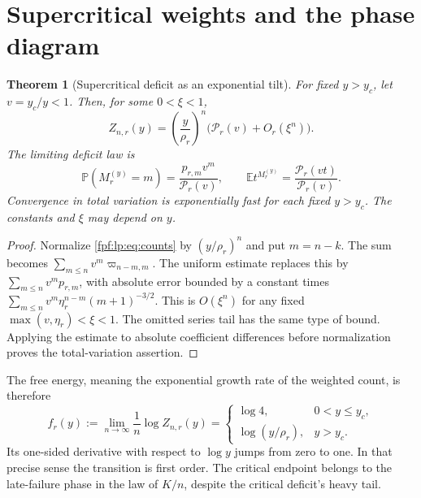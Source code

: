 \documentclass[11pt]{article}
\numberwithin{equation}{section}
\newtheorem{theorem}{Theorem}[section]
\theoremstyle{definition}
\newcommand{\E}{\mathbb E}
\newcommand{\Prob}{\mathbb P}
\begin{document}
\section{Supercritical weights and the phase diagram}
\label{fpf:lp:sec:supercritical}

\begin{theorem}[Supercritical deficit as an exponential tilt]
\label{fpf:lp:thm:supercritical}
For fixed \(y>y_c\), let \(v=y_c/y<1\). Then, for some \(0<\xi<1\),
\begin{equation}\label{fpf:lp:eq:super-Z}
 Z_{n,r}(y)=\left(\frac y{\rho_r}\right)^n
                   \bigl(\mathcal P_r(v)+O_r(\xi^n)\bigr).
\end{equation}
The limiting deficit law is
\begin{equation}\label{fpf:lp:eq:super-law}
 \Prob(M_r^{(y)}=m)=\frac{p_{r,m}v^m}{\mathcal P_r(v)},\qquad
 \E t^{M_r^{(y)}}=\frac{\mathcal P_r(vt)}{\mathcal P_r(v)}.
\end{equation}
Convergence in total variation is exponentially fast for each fixed
\(y>y_c\). The constants and \(\xi\) may depend on \(y\).
\end{theorem}
\begin{proof}
Normalize \eqref{fpf:lp:eq:counts} by \((y/\rho_r)^n\) and put \(m=n-k\).
The sum becomes \(\sum_{m\le n}v^m\varpi_{n-m,m}\). The uniform estimate
replaces this by \(\sum_{m\le n}v^mp_{r,m}\), with absolute error
bounded by a constant times
\(\sum_{m\le n}v^m\eta_r^{n-m}(m+1)^{-3/2}\).
This is \(O(\xi^n)\) for any fixed
\(\max(v,\eta_r)<\xi<1\). The omitted series tail has the same type
of bound. Applying the estimate to absolute coefficient differences
before normalization proves the total-variation assertion.
\end{proof}

The free energy, meaning the exponential growth rate of the weighted
count, is therefore
\begin{equation}\label{fpf:lp:eq:free-energy}
 f_r(y):=\lim_{n\to\infty}\frac1n\log Z_{n,r}(y)
 =\begin{cases}\log4,&0<y\le y_c,\\
                 \log(y/\rho_r),&y>y_c.
   \end{cases}
\end{equation}
Its one-sided derivative with respect to \(\log y\) jumps from zero
to one. In that precise sense the transition is first order.
The critical endpoint belongs to the late-failure phase in the law of
\(K/n\), despite the critical deficit's heavy tail.
\end{document}
